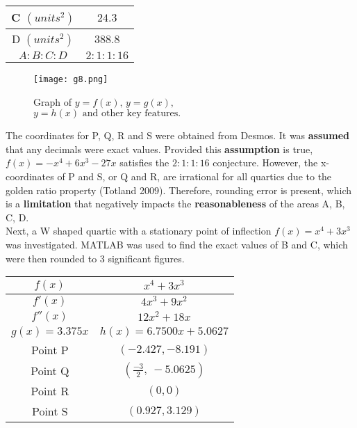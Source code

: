\documentclass{homework}
\begin{document}
\begin{flushleft}
\begin{paracol}{2}
\begin{tabular}{|c|c|}
    C $(units^2)$ & $24.3$  \\ \hline
    D $(units^2)$ & $388.8$ \\ \hline
    $A:B:C:D$  & $2:1:1:16$ \\ \hline
    \end{tabular}
    \endgroup
\switchcolumn
   \begin{figure}[htp]
        \centering
    \texttt{[image: g8.png]} \\
        \caption{Graph of $y=f(x),\, y=g(x),$\\ $y=h(x) \text{ and other key features.}$}
        \label{fig:g8}
    \end{figure}
    \switchcolumn
\end{paracol}  
\newpage
The coordinates for P, Q, R and S were obtained from Desmos. It was \textbf{assumed} that any decimals were exact values. Provided this \textbf{assumption} is true, $f(x)=-x^4+6x^3-27x$ satisfies the $2:1:1:16$ conjecture. However, the x-coordinates of P and S, or Q and R, are irrational for all quartics due to the golden ratio property (Totland 2009). Therefore, rounding error is present, which is a \textbf{limitation} that negatively impacts the \textbf{reasonableness} of the areas A, B, C, D. \vspace{1em} \\
Next, a W shaped quartic with a stationary point of inflection $f(x)=x^{4}+3x^{3}$ was investigated. MATLAB was used to find the exact values of B and C, which were then rounded to 3 significant figures.  \\
\begin{paracol}{2}
    \vspace{1em}
    \begingroup
    \setlength{\tabcolsep}{1.7em}
    \renewcommand{\arraystretch}{1.4}
    \begin{tabular}{|c|c|} \hline
     $f(x)$  & $x^{4}+3x^{3} $ \\ \hline 
     $f'(x)$  & $4x^3 + 9x^2$ \\ \hline
     $f''(x)$  & $12x^2+18x$ \\ \hline
      $g(x)=3.375x$  & $h(x)=6.7500x+5.0627$ \\ \hline
      Point P & $\left(-2.427,-8.191\right)$ \\ \hline
      Point Q & $\left(\frac{-3}{2},\ -5.0625\right)$ \\ \hline
      Point R & $(0,0)$ \\ \hline
      Point S & $\left(0.927,3.129\right)$ \\ \hline

\end{tabular}
\end{paracol}
\end{flushleft}
\end{document}
